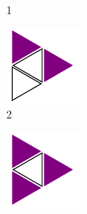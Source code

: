 \documentclass{article}
\begin{document}
\begin{figure}[H]
\begin{subfigure}[b]{0.1\textwidth}
         \caption*{1}
     \end{subfigure}
     \hfill
     \begin{subfigure}[b]{0.1\textwidth}
         \centering
         \includegraphics[width=\textwidth]{graphics/introduction/configurations/c2.pdf}
         \caption*{2}
     \end{subfigure}
     \hfill
     \begin{subfigure}[b]{0.1\textwidth}
         \centering
         \includegraphics[width=\textwidth]{graphics/introduction/configurations/c3.pdf}

\end{subfigure}
\end{figure}
\end{document}
